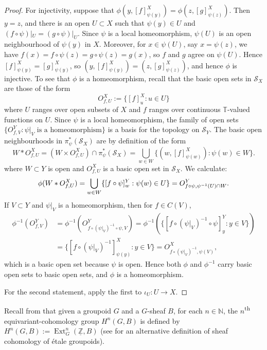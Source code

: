 \documentclass[12pt,a4paper]{amsart}
\newcommand{\field}[1]{\mathbb{#1}}
\newcommand{\NN}{\field{N}}
\newcommand{\TT}{\field{T}}
\newcommand{\ZZ}{\field{Z}}
\newcommand{\Ext}{\operatorname{Ext}}
\newcommand{\Tgerms}{\mathcal{S}}
\begin{document}
\begin{proof}
For injectivity, suppose that $\phi(y, [f]^X_{\psi(y)}) =
\phi(z, [g]^X_{\psi(z)})$. Then $y = z$, and there is an open $U
\subset X$ such that $\psi(y) \in U$ and $(f \circ \psi)|_U = (g
\circ \psi)|_U$. Since $\psi$ is a local homeomorphism,
$\psi(U)$ is an open neighbourhood of $\psi(y)$ in $X$.
Moreover, for $x \in \psi(U)$, say $x = \psi(z)$, we have $f(x)
= f \circ \psi (z) = g \circ \psi(z) = g(x)$, so $f$ and $g$
agree on $\psi(U)$. Hence $[f]^X_{\psi(y)} = [g]^X_{\psi(y)}$,
so $(y, [f]^X_{\psi(y)}) = (z, [g]^X_{\psi(z)})$, and hence
$\phi$ is injective. To see that $\phi$ is a homeomorphism,
recall that the basic open sets in $\Tgerms_X$ are those of the
form
\[
O^X_{f,U} := \{[f]^X_u : u \in U\}
\]
where $U$ ranges over open subsets of $X$ and $f$ ranges over
continuous $\TT$-valued functions on $U$. Since $\psi$ is a
local homeomorphism, the family of open sets $\{O^Y_{f,V} :
\psi|_V\text{ is a homeomorphism}\}$ is a basis for the
topology on $\Tgerms_Y$. The basic open neighbourhoods in
$\pi_\psi^*(\Tgerms_X)$ are by definition of the form
\[
W \ast O^X_{f,U}
    = (W \times O^X_{f,U}) \cap \pi_\psi^*(\Tgerms_X)
    = \bigcup_{w \in W} \{(w, [f]^X_{\psi(w)}) : \psi(w) \in W\}.
\]
where $W \subset Y$ is open and $O^X_{f,U}$ is a basic
open set in $\Tgerms_X$. We calculate:
\[
\phi(W \ast O^X_{f,U})
    = \bigcup_{w \in W}\{ [f \circ \psi]^Y_w : \psi(w) \in U\} \\
    = O^Y_{f \circ \psi, \psi^{-1}(U) \cap W}.
\]
If $V \subset Y$ and $\psi|_V$ is a homeomorphism, then for $f
\in C(V)$,
\begin{align*}
\phi^{-1}(O^Y_{f,V})
    &= \phi^{-1}(O^Y_{f \circ(\psi|_V)^{-1} \circ \psi, V})
    = \phi^{-1}(\{[f \circ (\psi|_V)^{-1} \circ \psi]^Y_y : y \in V\}) \\
    &= \{[f \circ (\psi|_V)^{-1}]^X_{\psi(y)} : y \in V\}
    = O^X_{f \circ (\psi|_V)^{-1}, \psi(V)},
\end{align*}
which is a basic open set because $\psi$ is open. Hence both
$\phi$ and $\phi^{-1}$ carry basic open sets to basic open sets,
and $\phi$ is a homeomorphism.

For the second statement, apply the first to $\iota_U : U \to
X$.
\end{proof}

Recall from \cite[page~215]{Kumjian1988} that given a groupoid
$G$ and a $G$-sheaf $B$, for each $n \in \NN$, the
$n$\textsuperscript{th} equivariant-cohomology group $H^n(G,B)$
is defined by $H^n(G,B) := \Ext^n_G(\underline{\ZZ}, B)$ (see
\cite{Haefliger76} for an alternative definition of sheaf
cohomology of \'{e}tale groupoids).
\end{document}
